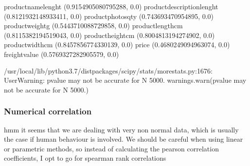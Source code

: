 \documentclass[letterpaper,10pt,english]{jupyterBook}
\begin{document}
\begin{sphinxVerbatim}[commandchars=\\\{\}]
product\PYGZus{}name\PYGZus{}lenght
(0.9154905080795288, 0.0)
product\PYGZus{}description\PYGZus{}lenght
(0.8121932148933411, 0.0)
product\PYGZus{}photos\PYGZus{}qty
(0.743693470954895, 0.0)
product\PYGZus{}weight\PYGZus{}g
(0.5443710088729858, 0.0)
product\PYGZus{}length\PYGZus{}cm
(0.8115382194519043, 0.0)
product\PYGZus{}height\PYGZus{}cm
(0.8004813194274902, 0.0)
product\PYGZus{}width\PYGZus{}cm
(0.8457856774330139, 0.0)
price
(0.4680249094963074, 0.0)
freight\PYGZus{}value
(0.5769327282905579, 0.0)
\end{sphinxVerbatim}

\begin{sphinxVerbatim}[commandchars=\\\{\}]
/usr/local/lib/python3.7/dist\PYGZhy{}packages/scipy/stats/morestats.py:1676: UserWarning: p\PYGZhy{}value may not be accurate for N \PYGZgt{} 5000.
  warnings.warn(\PYGZdq{}p\PYGZhy{}value may not be accurate for N \PYGZgt{} 5000.\PYGZdq{})
\end{sphinxVerbatim}


\subsubsection{Numerical correlation}
\label{\detokenize{c7_case_studies/Olist:numerical-correlation}}
\sphinxAtStartPar
hmm it seems that we are dealing with very non normal data, which is usually the case if human behaviour is involved. We should be careful when using linear or parametric methods, so instead of calculating the pearson correlation coefficients, I opt to go for spearman rank correlations

\begin{sphinxVerbatim}[commandchars=\\\{\}]
  \PYG{p}{[}  \PYG{p}{]}
\end{sphinxVerbatim}
\end{document}
